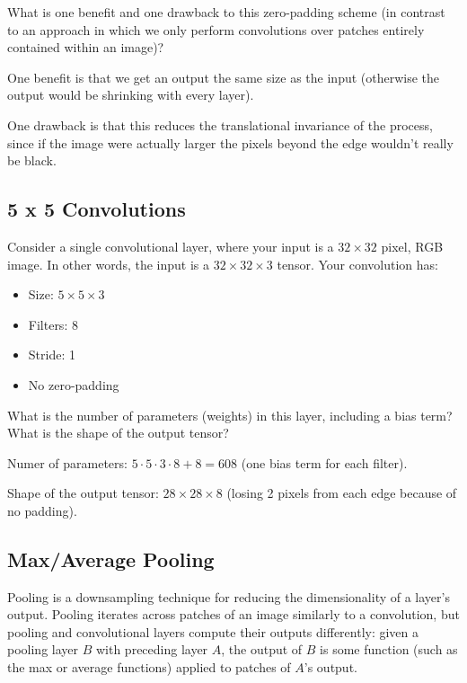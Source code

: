 What is one benefit and one drawback to this zero-padding scheme (in contrast to an approach in which we only perform convolutions over patches entirely contained within an image)?

\begin{solution}
  One benefit is that we get an output the same size as the input (otherwise the output would be shrinking with every layer).

  One drawback is that this reduces the translational invariance of the process, since if the image were actually larger the pixels beyond the edge wouldn't really be black.
\end{solution}

\subsection{5 x 5 Convolutions}

Consider a single convolutional layer, where your input is a $32 \times 32$ pixel, RGB image. In other words, the input is a $32 \times 32 \times 3$ tensor. Your convolution has:

\begin{itemize}
\item Size: $5 \times 5 \times 3$
\item Filters: 8
\item Stride: 1
\item No zero-padding
\end{itemize}

\problem[2] What is the number of parameters (weights) in this layer, including a bias term? What is the shape of the output tensor?

\begin{subsolution}
  Numer of parameters: $5 \cdot 5 \cdot 3 \cdot 8 + 8= 608$ (one bias term for each filter).

  Shape of the output tensor: $28 \times 28 \times 8$ (losing 2 pixels from each edge because of no padding).
\end{subsolution}


 \subsection{Max/Average Pooling}

Pooling is a downsampling technique for reducing the dimensionality of a layer's output. Pooling iterates across patches of an image similarly to a convolution, but pooling and convolutional layers compute their outputs differently: given a pooling layer $B$ with preceding layer $A$, the output of $B$ is some function (such as the max or average functions) applied to patches of $A$'s output.

